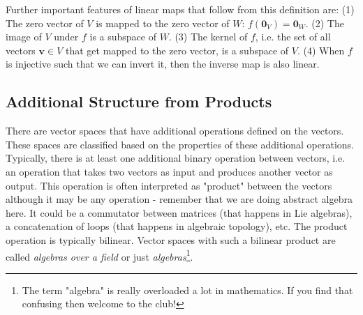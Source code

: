 \medskip
Further important features of linear maps that follow from this definition are: (1) The zero vector of $V$ is mapped to the zero vector of $W$: $f(\mathbf{0}_V) = \mathbf{0}_W$. (2) The image of $V$ under $f$ is a subspace of $W$. (3) The kernel of $f$, i.e. the set of all vectors $\mathbf{v} \in V$ that get mapped to the zero vector, is a subspace of $V$. (4) When $f$ is injective such that we can invert it, then the inverse map is also linear.






\subsection{Additional Structure from Products} 
There are vector spaces that have additional operations defined on the vectors. These spaces are classified based on the properties of these additional operations. Typically, there is at least one additional binary operation between vectors, i.e. an operation that takes two vectors as input and produces another vector as output. This operation is often interpreted as "product" between the vectors although it may be any operation - remember that we are doing abstract algebra here. It could be a commutator between matrices (that happens in Lie algebras), a concatenation of loops (that happens in algebraic topology), etc. The product operation is typically bilinear. Vector spaces with such a bilinear product are called \emph{algebras over a field} or just \emph{algebras}\footnote{The term "algebra" is really overloaded a lot in mathematics. If you find that confusing then welcome to the club!}.



